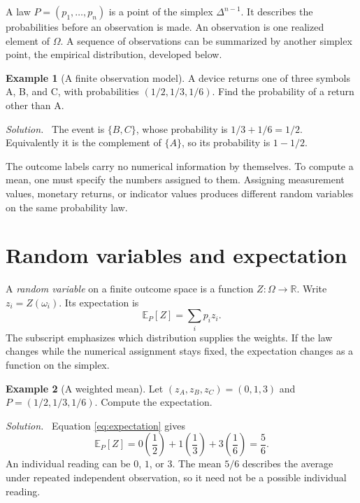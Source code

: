 \documentclass[11pt,oneside,openany]{book}
\theoremstyle{definition}
\newtheorem{example}{Example}[chapter]
\theoremstyle{remark}
\newenvironment{solution}{\par\smallskip\noindent\textit{Solution.}\ }{\par\smallskip}
\newcommand{\R}{\mathbb{R}}
\newcommand{\E}{\mathbb{E}}
\numberwithin{equation}{chapter}
\begin{document}
A law $P=(p_1,\ldots,p_n)$ is a point of the simplex $\Delta^{n-1}$. It describes the probabilities before an observation is made. An observation is one realized element of $\Omega$. A sequence of observations can be summarized by another simplex point, the empirical distribution, developed below.

\begin{example}[A finite observation model]
A device returns one of three symbols A, B, and C, with probabilities $(1/2,1/3,1/6)$. Find the probability of a return other than A.
\begin{solution}
The event is $\{B,C\}$, whose probability is $1/3+1/6=1/2$. Equivalently it is the complement of $\{A\}$, so its probability is $1-1/2$.
\end{solution}
\end{example}

The outcome labels carry no numerical information by themselves. To compute a mean, one must specify the numbers assigned to them. Assigning measurement values, monetary returns, or indicator values produces different random variables on the same probability law.

\section{Random variables and expectation}
A \emph{random variable} on a finite outcome space is a function $Z:\Omega\to\R$. Write $z_i=Z(\omega_i)$. Its expectation is
\begin{equation}\label{eq:expectation}
\E_P[Z]=\sum_i p_i z_i.
\end{equation}
The subscript emphasizes which distribution supplies the weights. If the law changes while the numerical assignment stays fixed, the expectation changes as a function on the simplex.

\begin{example}[A weighted mean]
Let $(z_A,z_B,z_C)=(0,1,3)$ and $P=(1/2,1/3,1/6)$. Compute the expectation.
\begin{solution}
Equation \eqref{eq:expectation} gives
\[
\E_P[Z]=0\left(\frac12\right)+1\left(\frac13\right)+3\left(\frac16\right)=\frac56.
\]
An individual reading can be $0$, $1$, or $3$. The mean $5/6$ describes the average under repeated independent observation, so it need not be a possible individual reading.
\end{solution}
\end{example}
\end{document}
